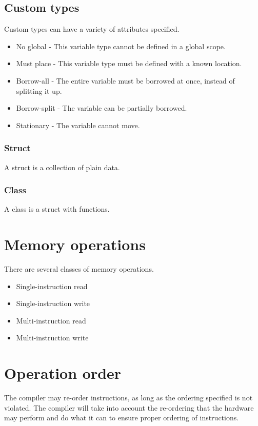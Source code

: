 \documentclass[12pt]{article}
\begin{document}
\subsection {Custom types}

Custom types can have a variety of attributes specified.

\begin{itemize}
\item No global - This variable type cannot be defined in a global scope.
\item Must place - This variable type must be defined with a known location.
\item Borrow-all - The entire variable must be borrowed at once, instead of splitting it up.
\item Borrow-split - The variable can be partially borrowed.
\item Stationary - The variable cannot move.
\end{itemize}

\subsubsection {Struct}
A struct is a collection of plain data.

\subsubsection {Class}
A class is a struct with functions.

\section { Memory operations }
There are several classes of memory operations.
\begin{itemize}
\item Single-instruction read
\item Single-instruction write
\item Multi-instruction read
\item Multi-instruction write
\end{itemize}

\section {Operation order}
The compiler may re-order instructions, as long as the ordering specified is not violated. 
The compiler will take into account the re-ordering that the hardware may perform and do what it can to ensure proper
ordering of instructions.
\end{document}
